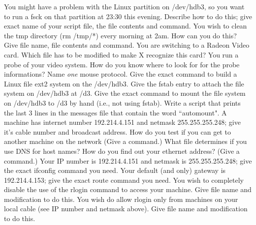 \vskip 0.4in
You might have a problem with the Linux partition on {\ltt{}/dev/hdb3},
so you want to run a {\ltt{}fsck} on that partition at 23:30 this
evening.
Describe how to do this; give exact name of your script file, the file contents
and command.
\vskip 1.6in
You wish to clean the tmp directory ({\ltt{}rm /tmp/*}) every morning
at 2am.
How can you do this? Give file name, file contents and command.
\vskip 1.4in
\ques
You are switching to a Radeon Video card.
Which file has to be modified to make X recognize this card?
\vskip 0.4in
You run a probe of your video system.
How do you know where to look for for the probe informations?
\vskip 0.4in
Name {\it one} mouse protocol.
\vskip 0.4in
\ques
Give the exact command to build a Linux file ext2 system on the
{\ltt{}/dev/hdb3}.
\vskip 0.4in
Give the {\ltt{}fstab} entry to attach the file system
on {\ltt{}/dev/hdb3} at {\ltt{}/d3}.
\vskip 0.4in
Give the exact command to mount the file system on {\ltt{}/dev/hdb3}
to {\ltt{}/d3} by hand (i.e., not using {\ltt{}fstab}).
\vskip 0.4in
\vfill\eject
\ques
Write a script that prints the last 3 lines in the messages file that
contain the word ``automount".
\vskip 2.0in
\ques
A machine has internet number {\ltt{}192.214.4.151} and
netmask {\ltt{}255.255.255.248}; give it's cable number and broadcast address.
\vskip 1.0in
How do you test if you can get to another machine on the network
(Give a command.)
\vskip 0.4in
What file determines if you use DNS for host names?
\vskip 0.4in
How do you find out your ethernet address?
(Give a command.)
\vskip 0.4in
\ques
Your IP number is {\ltt{}192.214.4.151} and netmask is {\ltt{}255.255.255.248};
give the exact {\ltt{}ifconfig} command you need.
\vskip 0.4in
Your default (and only) gateway is {\ltt{}192.214.4.153};
give the exact {\ltt{}route} command you need.
\vskip 0.4in
You wish to completely disable the use of the {\ltt{}rlogin} command to
access your machine.
Give file name and modification to do this.
\vskip 0.8in
You wish do allow {\ltt{}rlogin} only from machines on your local cable
(see IP number and netmask above).
Give file name and modification to do this.
\vskip 0.8in
\bye
